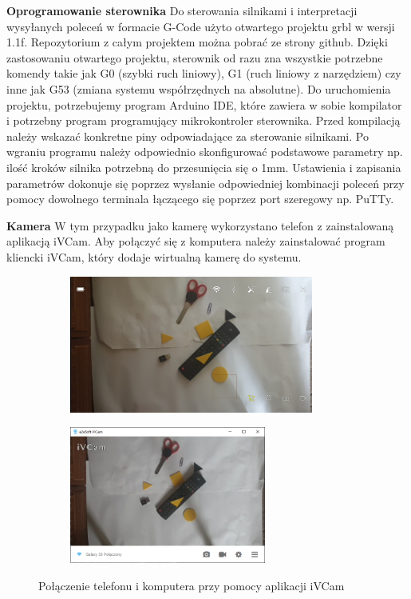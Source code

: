 \textbf{Oprogramowanie sterownika} \newline
Do sterowania silnikami i interpretacji wysyłanych poleceń w formacie G-Code użyto otwartego projektu 
grbl\cite{grblGithub} w wersji 1.1f. Repozytorium z całym projektem można pobrać ze strony github. 
Dzięki zastosowaniu otwartego projektu, sterownik od razu zna wszystkie potrzebne komendy takie jak 
G0 (szybki ruch liniowy), G1 (ruch liniowy z narzędziem) czy inne jak G53 (zmiana systemu współrzędnych na absolutne).
Do uruchomienia projektu, potrzebujemy program Arduino IDE, które zawiera w sobie kompilator i potrzebny program programujący 
mikrokontroler sterownika. Przed kompilacją należy wskazać konkretne piny odpowiadające za sterowanie silnikami. 
Po wgraniu programu należy odpowiednio skonfigurować podstawowe parametry np. ilość kroków silnika potrzebną do przesunięcia się o 1mm. 
Ustawienia i zapisania parametrów dokonuje się poprzez wysłanie odpowiedniej kombinacji poleceń przy pomocy dowolnego 
terminala łączącego się poprzez port szeregowy np. PuTTy.

\textbf{Kamera} \newline
W tym przypadku jako kamerę wykorzystano telefon z zainstalowaną aplikacją iVCam. Aby połączyć się z komputera należy zainstalować 
program kliencki iVCam, który dodaje wirtualną kamerę do systemu. 
\begin{figure}[H]
	\begin{subfigure}{}
		\includegraphics[height=4.5cm]{pages/dodatekARobot/img/kameraTelefon.jpg}
	\end{subfigure}
	\begin{subfigure}{}
		\includegraphics[height=4.5cm]{pages/dodatekARobot/img/kameraDesktop.png}
	\end{subfigure}
	\caption{Połączenie telefonu i komputera przy pomocy aplikacji iVCam}
\end{figure}

